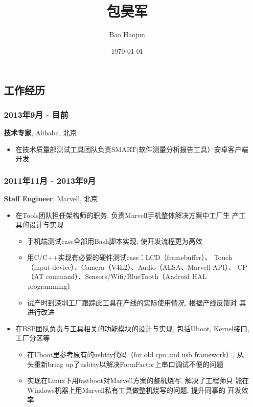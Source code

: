 \documentclass[11pt,dvipdfmx,CJKbookmarks]{article}
\author{Bao Haojun}
\date{\today}
\title{包昊军}
\begin{document}
\begin{CJK*}{UTF8}{simsun}

\maketitle



\section{工作经历}
\label{sec-1}
\subsubsection{2013年9月 - 目前}
\label{sec-1-0-1}
\textbf{技术专家}, Alibaba, 北京

\begin{itemize}
\item 在技术质量部测试工具团队负责SMART(软件测量分析报告工具）安卓客户端开发
\end{itemize}
\subsubsection{2011年11月 - 2013年9月}
\label{sec-1-0-2}
\textbf{Staff Engineer}, \href{http://marvell.com}{Marvell}, 北京

\begin{itemize}
\item 在Tools团队担任架构师的职务, 负责Marvell手机整体解决方案中工厂生
产工具的设计与实现
\begin{itemize}
\item 手机端测试case全部用Bash脚本实现, 使开发流程更为高效

\item 用C/C++实现有必要的硬件测试case：LCD（framebuffer）、
Touch（input device）、Camera（V4L2）、Audio（ALSA、Marvell API）、
CP（AT command）、Sensors/Wifi/BlueTooth（Android HAL
programming）

\item 试产时到深圳工厂跟踪此工具在产线的实际使用情况, 根据产线反馈对
其进行改进
\end{itemize}

\item 在BSP团队负责与工具相关的功能模块的设计与实现, 包括Uboot, Kernel接口,
工厂分区等

\begin{itemize}
\item 在Uboot里参考原有的usbtty代码（for old cpu and usb framework）,
从头重新bring up了usbtty以解决FormFactor上串口调试不便的问题
\item 实现在Linux下用fastboot对Marvell方案的整机烧写, 解决了工程师只
能在Windows机器上用Marvell私有工具做整机烧写的问题, 提升同事的
开发效率
\end{itemize}


\end{itemize}
\end{CJK*}
\end{document}
